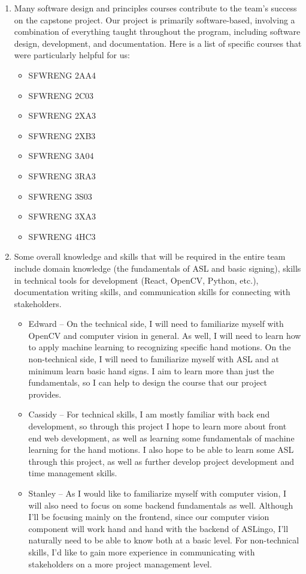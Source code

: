 \documentclass[12pt, titlepage]{article}
\begin{document}
\begin{enumerate}
    \item Many software design and principles courses contribute to the team's success on the capstone project. Our project is primarily software-based, involving a combination of everything taught throughout the program, including software design, development, and documentation. Here is a list of specific courses that were particularly helpful for us: 
    \begin{itemize}
        \item SFWRENG 2AA4
        \item SFWRENG 2C03
        \item SFWRENG 2XA3
        \item SFWRENG 2XB3
        \item SFWRENG 3A04
        \item SFWRENG 3RA3
        \item SFWRENG 3S03
        \item SFWRENG 3XA3
        \item SFWRENG 4HC3
    \end{itemize}
    \item Some overall knowledge and skills that will be required in the entire team include domain knowledge (the fundamentals of ASL and basic signing), skills in technical tools for development (React, OpenCV, Python, etc.), documentation writing skills, and communication skills for connecting with stakeholders.
    \begin{itemize}
        \item Edward -- On the technical side, I will need to familiarize myself with OpenCV and computer vision in general. As well, I will need to learn how to apply machine learning to recognizing specific hand motions. On the non-technical side, I will need to familiarize myself with ASL and at minimum learn basic hand signs. I aim to learn more than just the fundamentals, so I can help to design the course that our project provides.
	    \item Cassidy -- For technical skills, I am mostly familiar with back end development, so through this project I hope to learn more about front end web development, as well as learning some fundamentals of machine learning for the hand motions. I also hope to be able to learn some ASL through this project, as well as further develop project development and time management skills.
        \item Stanley -- As I would like to familiarize myself with computer vision, I will also need to focus on some backend fundamentals as well. Although I'll be focusing mainly on the frontend, since our computer vision component will work hand and hand with the backend of ASLingo, I'll naturally need to be able to know both at a basic level. For non-technical skills, I'd like to gain more experience in communicating with stakeholders on a more project management level.

\end{itemize}
\end{enumerate}
\end{document}
